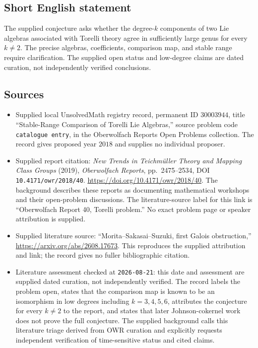 \documentclass[11pt]{article}
\begin{document}
\subsection{Short English statement}
The supplied conjecture asks whether the degree-\(k\) components of two Lie algebras associated with Torelli theory agree in sufficiently large genus for every \(k\ne2\). The precise algebras, coefficients, comparison map, and stable range require clarification. The supplied open status and low-degree claims are dated curation, not independently verified conclusions.
\subsection{Sources}
\begin{itemize}
\item Supplied local UnsolvedMath registry record, permanent ID \(30003944\), title ``Stable-Range Comparison of Torelli Lie Algebras,'' source problem code \texttt{catalogue entry}, in the Oberwolfach Reports Open Problems collection. The record gives proposed year \(2018\) and supplies no individual proposer.
\item Supplied report citation: \emph{New Trends in Teichm\"uller Theory and Mapping Class Groups} (2019), \emph{Oberwolfach Reports}, pp.~2475--2534, DOI \texttt{10.4171/owr/2018/40}. \url{https://doi.org/10.4171/owr/2018/40}. The background describes these reports as documenting mathematical workshops and their open-problem discussions. The literature-source label for this link is ``Oberwolfach Report 40, Torelli problem.'' No exact problem page or speaker attribution is supplied.
\item Supplied literature source: ``Morita--Sakasai--Suzuki, first Galois obstruction,'' \url{https://arxiv.org/abs/2608.17673}. This reproduces the supplied attribution and link; the record gives no fuller bibliographic citation.
\item Literature assessment checked at \texttt{2026-08-21}: this date and assessment are supplied dated curation, not independently verified. The record labels the problem open, states that the comparison map is known to be an isomorphism in low degrees including \(k=3,4,5,6\), attributes the conjecture for every \(k\ne2\) to the report, and states that later Johnson-cokernel work does not prove the full conjecture. The supplied background calls this literature triage derived from OWR curation and explicitly requests independent verification of time-sensitive status and cited claims.
\end{itemize}
\end{document}
